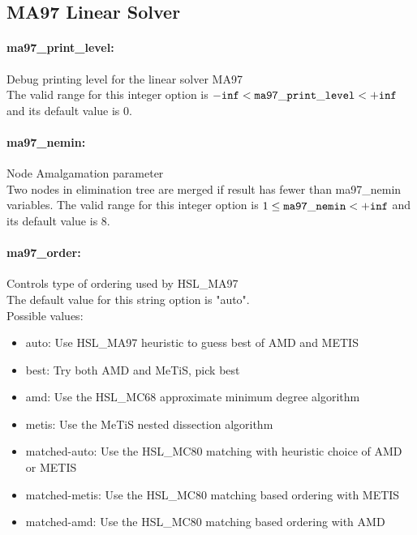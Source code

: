 \subsection{MA97 Linear Solver}

\paragraph{ma97\_print\_level:}\label{opt:ma97_print_level} Debug printing level for the linear solver MA97 \\
 The valid range for this integer option is
${\tt -inf} <  {\tt ma97\_print\_level } <  {\tt +inf}$
and its default value is $0$.


\paragraph{ma97\_nemin:}\label{opt:ma97_nemin} Node Amalgamation parameter \\
 Two nodes in elimination tree are merged if
result has fewer than ma97\_nemin variables. The valid range for this integer option is
$1 \le {\tt ma97\_nemin } <  {\tt +inf}$
and its default value is $8$.


\paragraph{ma97\_order:}\label{opt:ma97_order} Controls type of ordering used by HSL\_MA97 \\
 The default value for this string option is "auto".
\\ 
Possible values:
\begin{itemize}
   \item auto: Use HSL\_MA97 heuristic to guess best of AMD
and METIS
   \item best: Try both AMD and MeTiS, pick best
   \item amd: Use the HSL\_MC68 approximate minimum degree
algorithm
   \item metis: Use the MeTiS nested dissection algorithm
   \item matched-auto: Use the HSL\_MC80 matching with heuristic
choice of AMD or METIS
   \item matched-metis: Use the HSL\_MC80 matching based ordering with
METIS
   \item matched-amd: Use the HSL\_MC80 matching based ordering with
AMD
\end{itemize}

